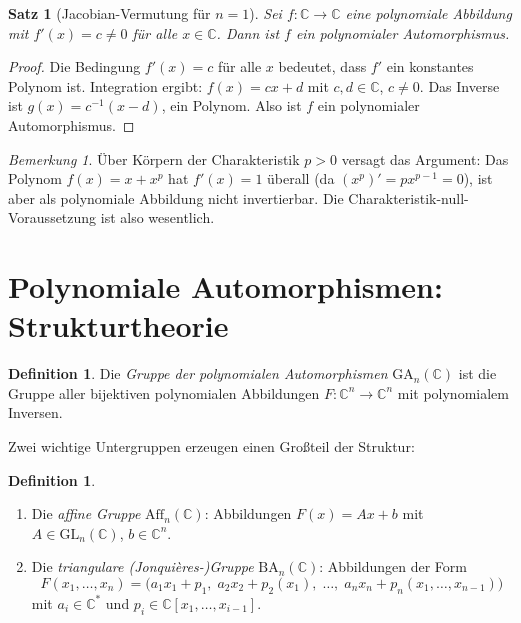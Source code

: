 \documentclass[12pt,a4paper]{amsart}
\newtheorem{satz}[theorem]{Satz}
\theoremstyle{definition}
\newtheorem{definition_de}[theorem]{Definition}
\theoremstyle{remark}
\newtheorem{bemerkung}[theorem]{Bemerkung}
\begin{document}
\begin{satz}[Jacobian-Vermutung für $n=1$]\label{satz:n1}
Sei $f \colon \mathbb{C} \to \mathbb{C}$ eine polynomiale Abbildung mit $f'(x) = c \neq 0$
für alle $x \in \mathbb{C}$. Dann ist $f$ ein polynomialer Automorphismus.
\end{satz}

\begin{proof}
Die Bedingung $f'(x) = c$ für alle $x$ bedeutet, dass $f'$ ein konstantes Polynom
ist. Integration ergibt: $f(x) = cx + d$ mit $c, d \in \mathbb{C}$, $c \neq 0$.
Das Inverse ist $g(x) = c^{-1}(x - d)$, ein Polynom. Also ist $f$ ein polynomialer
Automorphismus.
\end{proof}

\begin{bemerkung}
Über Körpern der Charakteristik $p > 0$ versagt das Argument: Das Polynom
$f(x) = x + x^p$ hat $f'(x) = 1$ überall (da $(x^p)' = px^{p-1} = 0$), ist
aber als polynomiale Abbildung nicht invertierbar. Die Charakteristik-null-Voraussetzung
ist also wesentlich.
\end{bemerkung}

\section{Polynomiale Automorphismen: Strukturtheorie}
\label{abschn:struct}

\begin{definition_de}
Die \emph{Gruppe der polynomialen Automorphismen} $\mathrm{GA}_n(\mathbb{C})$ ist
die Gruppe aller bijektiven polynomialen Abbildungen $F \colon \mathbb{C}^n \to \mathbb{C}^n$
mit polynomialem Inversen.
\end{definition_de}

Zwei wichtige Untergruppen erzeugen einen Großteil der Struktur:

\begin{definition_de}
\begin{enumerate}[label=(\alph*)]
  \item Die \emph{affine Gruppe} $\mathrm{Aff}_n(\mathbb{C})$: Abbildungen
        $F(x) = Ax + b$ mit $A \in \mathrm{GL}_n(\mathbb{C})$, $b \in \mathbb{C}^n$.
  \item Die \emph{triangulare (Jonquières-)Gruppe} $\mathrm{BA}_n(\mathbb{C})$:
        Abbildungen der Form
        \[
          F(x_1,\ldots,x_n) = \bigl(a_1 x_1 + p_1,\;
           a_2 x_2 + p_2(x_1),\;\ldots,\;
           a_n x_n + p_n(x_1,\ldots,x_{n-1})\bigr)
        \]
        mit $a_i \in \mathbb{C}^*$ und $p_i \in \mathbb{C}[x_1,\ldots,x_{i-1}]$.
\end{enumerate}
\end{definition_de}
\end{document}

